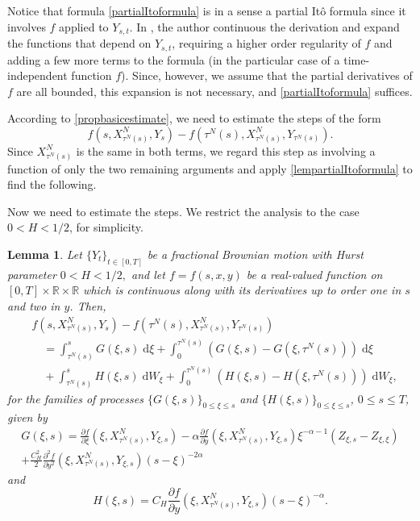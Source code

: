 \documentclass[reqno,12pt]{amsart}
\theoremstyle{plain}%
\newtheorem{lem}{Lemma}[section]
\theoremstyle{definition}
\begin{document}
Notice that formula \eqref{partialItoformula} is in a sense a partial It\^o formula since it involves $f$ applied to $Y_{s, t}$. In \cite[Theorem 2.7.6]{Mishura2008}, the author continuous the derivation and expand the functions that depend on $Y_{s, t}$, requiring a higher order regularity of $f$ and adding a few more terms to the formula (in the particular case of a time-independent function $f$). Since, however, we assume that the partial derivatives of $f$ are all bounded, this expansion is not necessary, and \eqref{partialItoformula} suffices.

According to \cref{propbasicestimate}, we need to estimate the steps of the form
\[
    f(s, X_{\tau^N(s)}^N, Y_s) - f(\tau^N(s), X_{\tau^N(s)}^N, Y_{\tau^N(s)}).
\]
Since $X_{\tau^N(s)}^N$ is the same in both terms, we regard this step as involving a function of only the two remaining arguments and apply \cref{lempartialItoformula} to find the following.

Now we need to estimate the steps. We restrict the analysis to the case $0 < H < 1/2$, for simplicity.

\begin{lem}
    \label{lemsinglestepwithfBm_alt}
    Let $\{Y_t\}_{t\in [0, T]}$ be a fractional Brownian motion with Hurst parameter $0 < H < 1/2,$ and let $f=f(s, x, y)$ be a real-valued function on $[0, T]\times\mathbb{R}\times \mathbb{R}$ which is continuous along with its derivatives up to order one in $s$ and two in $y$. Then,
    \begin{equation}
        \label{singlestepwithfBm_alt}
        \begin{aligned}
            & f(s, X_{\tau^N(s)}^N, Y_s) - f(\tau^N(s), X_{\tau^N(s)}^N, Y_{\tau^N(s)}) \\
            & \quad = \int_{\tau^N(s)}^{s} G(\xi, s) \;\mathrm{d}\xi + \int_0^{\tau^N(s)} (G(\xi, s) - G(\xi, \tau^N(s))) \;\mathrm{d}\xi \\
            & \quad + \int_{\tau^N(s)}^{s} H(\xi, s) \;\mathrm{d}W_\xi + \int_0^{\tau^N(s)} (H(\xi, s) - H(\xi, \tau^N(s))) \;\mathrm{d}W_\xi,
        \end{aligned}
    \end{equation}
    for the families of processes $\{G(\xi, s)\}_{0\leq\xi\leq s}$ and $\{H(\xi, s)\}_{0\leq\xi\leq s}$, $0\leq s \leq T$, given by
    \begin{multline}
        \label{defGtaus}
        G(\xi, s) = \frac{\partial f}{\partial \xi}(\xi, X_{\tau^N(s)}^N, Y_{\xi, s}) - \alpha \frac{\partial f}{\partial y}(\xi, X_{\tau^N(s)}^N, Y_{\xi, s})\xi^{-\alpha - 1} (Z_{\xi, s} - Z_{\xi, \xi}) \\ 
        + \frac{C_H^2}{2}\frac{\partial^2 f}{\partial y^2}(\xi, X_{\tau^N(s)}^N, Y_{\xi, s}) (s - \xi)^{-2\alpha}
    \end{multline}
    and
    \begin{equation}
        \label{defHtaus}
        H(\xi, s) = C_H\frac{\partial f}{\partial y}(\xi, X_{\tau^N(s)}^N, Y_{\xi, s})(s - \xi)^{-\alpha}.
    \end{equation}
\end{lem}
\end{document}
